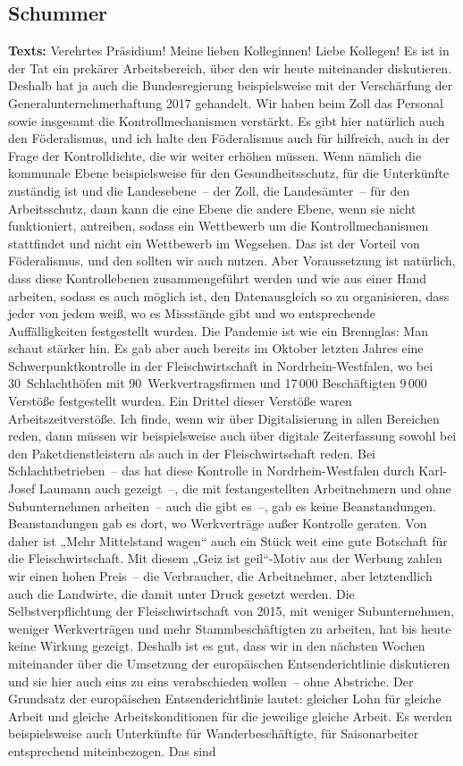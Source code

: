 \documentclass{article}
\begin{document}
\subsection{Schummer}
\noindent\textbf{Texts:} Verehrtes Präsidium! Meine lieben Kolleginnen! Liebe Kollegen! Es ist in der Tat ein prekärer Arbeitsbereich, über den wir heute miteinander diskutieren. Deshalb hat ja auch die Bundesregierung beispielsweise mit der Verschärfung der Generalunternehmerhaftung 2017 gehandelt. Wir haben beim Zoll das Personal sowie insgesamt die Kontrollmechanismen verstärkt. Es gibt hier natürlich auch den Föderalismus, und ich halte den Föderalismus auch für hilfreich, auch in der Frage der Kontrolldichte, die wir weiter erhöhen müssen. Wenn nämlich die kommunale Ebene beispielsweise für den Gesundheitsschutz, für die Unterkünfte zuständig ist und die Landesebene – der Zoll, die Landesämter – für den Arbeitsschutz, dann kann die eine Ebene die andere Ebene, wenn sie nicht funktioniert, antreiben, sodass ein Wettbewerb um die Kontrollmechanismen stattfindet und nicht ein Wettbewerb im Wegsehen. Das ist der Vorteil von Föderalismus, und den sollten wir auch nutzen.  Aber Voraussetzung ist natürlich, dass diese Kontrollebenen zusammengeführt werden und wie aus einer Hand arbeiten, sodass es auch möglich ist, den Datenausgleich so zu organisieren, dass jeder von jedem weiß, wo es Missstände gibt und wo entsprechende Auffälligkeiten festgestellt wurden. Die Pandemie ist wie ein Brennglas: Man schaut stärker hin. Es gab aber auch bereits im Oktober letzten Jahres eine Schwerpunktkontrolle in der Fleischwirtschaft in Nordrhein-Westfalen, wo bei 30 Schlachthöfen mit 90 Werkvertragsfirmen und 17 000 Beschäftigten 9 000 Verstöße festgestellt wurden. Ein Drittel dieser Verstöße waren Arbeitszeitverstöße. Ich finde, wenn wir über Digitalisierung in allen Bereichen reden, dann müssen wir beispielsweise auch über digitale Zeiterfassung sowohl bei den Paketdienstleistern als auch in der Fleischwirtschaft reden.  Bei Schlachtbetrieben – das hat diese Kontrolle in Nordrhein-Westfalen durch Karl-Josef Laumann auch gezeigt –, die mit festangestellten Arbeitnehmern und ohne Subunternehmen arbeiten – auch die gibt es –, gab es keine Beanstandungen. Beanstandungen gab es dort, wo Werkverträge außer Kontrolle geraten. Von daher ist „Mehr Mittelstand wagen“ auch ein Stück weit eine gute Botschaft für die Fleischwirtschaft. Mit diesem „Geiz ist geil“-Motiv aus der Werbung zahlen wir einen hohen Preis – die Verbraucher, die Arbeitnehmer, aber letztendlich auch die Landwirte, die damit unter Druck gesetzt werden. Die Selbstverpflichtung der Fleischwirtschaft von 2015, mit weniger Subunternehmen, weniger Werkverträgen und mehr Stammbeschäftigten zu arbeiten, hat bis heute keine Wirkung gezeigt. Deshalb ist es gut, dass wir in den nächsten Wochen miteinander über die Umsetzung der europäischen Entsenderichtlinie diskutieren und sie hier auch eins zu eins verabschieden wollen – ohne Abstriche.  Der Grundsatz der europäischen Entsenderichtlinie lautet: gleicher Lohn für gleiche Arbeit und gleiche Arbeitskonditionen für die jeweilige gleiche Arbeit.  Es werden beispielsweise auch Unterkünfte für Wanderbeschäftigte, für Saisonarbeiter entsprechend miteinbezogen. Das sind 
\end{document}
